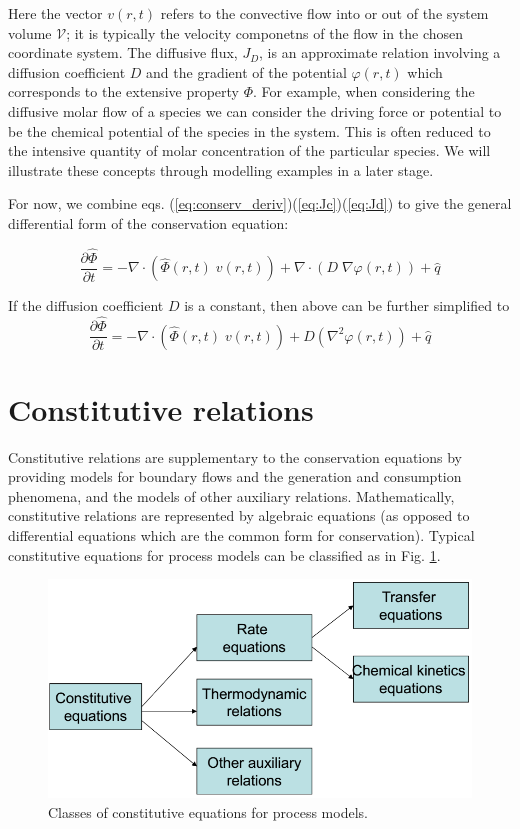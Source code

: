 \documentclass[a4paper,11pt]{article}
\theoremstyle{definition}
\begin{document}
\noindent Here the vector $v(r, t)$ refers to the convective flow into or out of the system volume $\mathcal{V}$;
it is typically the velocity componetns of the flow in the chosen coordinate system.
The diffusive flux, $J_D$, is an approximate relation involving a diffusion coefficient $D$ and the gradient of the 
potential $\varphi(r, t)$ which corresponds to the extensive property $\Phi$. For example, when considering the diffusive 
molar flow of a species we can consider the driving force or potential to be the chemical
potential of the species in the system. This is often reduced to the intensive quantity of
molar concentration of the particular species. We will illustrate these concepts through modelling examples
in a later stage.

For now, we combine eqs. (\ref{eq:conserv_deriv})(\ref{eq:Jc})(\ref{eq:Jd}) to give the general
differential form of the conservation equation:

\begin{equation} \label{eq:conserv_deriv_2}
	\frac{\partial \hat{\Phi}}{\partial t} = - \nabla \cdot \left( \hat{\Phi}(r, t) \; v(r, t) \right) 
		+ \nabla \cdot \left( D \; \nabla \varphi(r, t) \right)	 + \hat{q}
\end{equation}

\noindent If the diffusion coefficient $D$ is a constant, then above can be further simplified to
\begin{equation} \label{eq:conserv_deriv_3}
	\frac{\partial \hat{\Phi}}{\partial t} = - \nabla \cdot \left( \hat{\Phi}(r, t) \; v(r, t) \right) 
		+  D \left( \nabla^2 \varphi(r, t) \right) + \hat{q}
\end{equation}


\section{Constitutive relations}

Constitutive relations are supplementary to the conservation equations by providing models
for boundary flows and the generation and consumption phenomena, and the models of other auxiliary relations.
Mathematically, constitutive relations are represented by algebraic equations 
(as opposed to differential equations which are the common form for conservation).
Typical constitutive equations for process models can be classified as in Fig. \ref{fig:class_const}.

\begin{figure} [!h]
 \begin{center}
	\includegraphics[width=.55\textwidth]{class_const}
 \end{center}
 \caption{Classes of constitutive equations for process models.} 
 \label{fig:class_const}
\end{figure}
\end{document}

